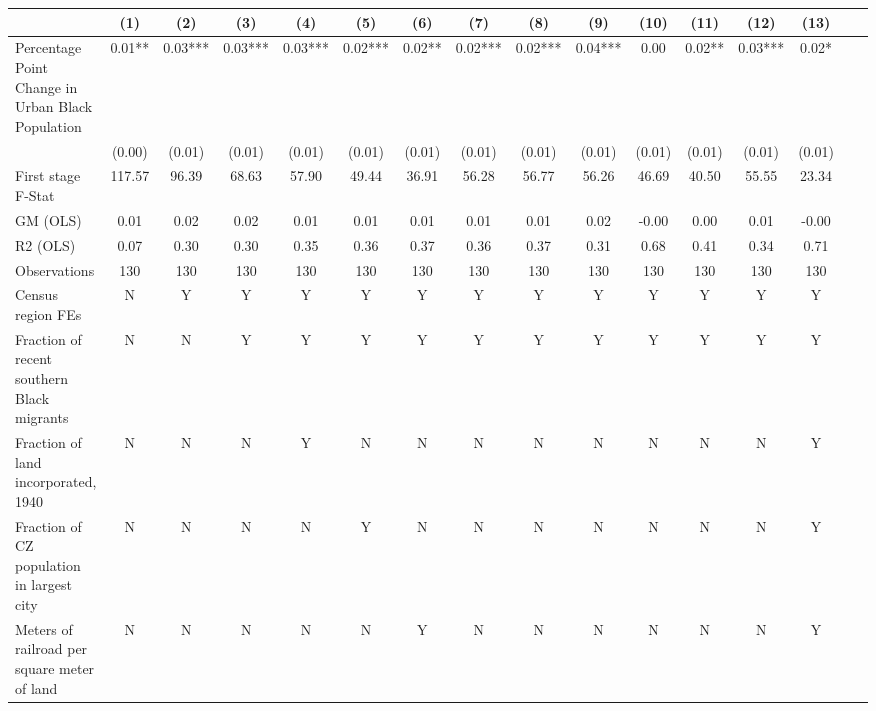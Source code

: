  \begin{tabular}{l*{15}{c}} \toprule
                    &\multicolumn{1}{c}{(1)}   &\multicolumn{1}{c}{(2)}   &\multicolumn{1}{c}{(3)}   &\multicolumn{1}{c}{(4)}   &\multicolumn{1}{c}{(5)}   &\multicolumn{1}{c}{(6)}   &\multicolumn{1}{c}{(7)}   &\multicolumn{1}{c}{(8)}   &\multicolumn{1}{c}{(9)}   &\multicolumn{1}{c}{(10)}   &\multicolumn{1}{c}{(11)}   &\multicolumn{1}{c}{(12)}   &\multicolumn{1}{c}{(13)}   \\
\midrule
Percentage Point Change in Urban Black Population&  0.01** &  0.03***&  0.03***&  0.03***&  0.02***&  0.02** &  0.02***&  0.02***&  0.04***&  0.00   &  0.02** &  0.03***&  0.02*  \\
                    &(0.00)   &(0.01)   &(0.01)   &(0.01)   &(0.01)   &(0.01)   &(0.01)   &(0.01)   &(0.01)   &(0.01)   &(0.01)   &(0.01)   &(0.01)   \\
\midrule
First stage F-Stat  &117.57   & 96.39   & 68.63   & 57.90   & 49.44   & 36.91   & 56.28   & 56.77   & 56.26   & 46.69   & 40.50   & 55.55   & 23.34   \\
GM (OLS)            &  0.01   &  0.02   &  0.02   &  0.01   &  0.01   &  0.01   &  0.01   &  0.01   &  0.02   & -0.00   &  0.00   &  0.01   & -0.00   \\
R2 (OLS)            &  0.07   &  0.30   &  0.30   &  0.35   &  0.36   &  0.37   &  0.36   &  0.37   &  0.31   &  0.68   &  0.41   &  0.34   &  0.71   \\
Observations        &   130   &   130   &   130   &   130   &   130   &   130   &   130   &   130   &   130   &   130   &   130   &   130   &   130   \\
Census region FEs   &     N   &     Y   &     Y   &     Y   &     Y   &     Y   &     Y   &     Y   &     Y   &     Y   &     Y   &     Y   &     Y   \\
Fraction of recent southern Black migrants&     N   &     N   &     Y   &     Y   &     Y   &     Y   &     Y   &     Y   &     Y   &     Y   &     Y   &     Y   &     Y   \\
Fraction of land incorporated, 1940&     N   &     N   &     N   &     Y   &     N   &     N   &     N   &     N   &     N   &     N   &     N   &     N   &     Y   \\
Fraction of CZ population in largest city&     N   &     N   &     N   &     N   &     Y   &     N   &     N   &     N   &     N   &     N   &     N   &     N   &     Y   \\
Meters of railroad per square meter of land&     N   &     N   &     N   &     N   &     N   &     Y   &     N   &     N   &     N   &     N   &     N   &     N   &     Y   \\

\end{tabular}
